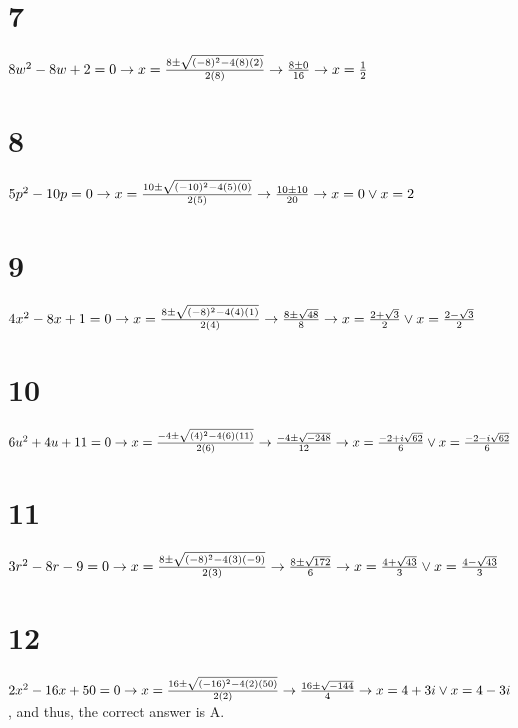 \documentclass{article}
\theoremstyle{definition}
\begin{document}
\section*{7}
$8w^2-8w+2=0\newline\rightarrow x=\frac{8\pm\sqrt{(-8)^2-4(8)(2)}}{2(8)}\newline\rightarrow \frac{8\pm 0}{16}\newline\rightarrow x=\frac{1}{2}$

\section*{8}
$5p^2-10p=0\newline\rightarrow x=\frac{10\pm\sqrt{(-10)^2-4(5)(0)}}{2(5)}\newline\rightarrow \frac{10\pm 10}{20}\newline\rightarrow x=0\vee x=2$

\section*{9}
$4x^2-8x+1=0\newline\rightarrow x=\frac{8\pm\sqrt{(-8)^2-4(4)(1)}}{2(4)}\newline\rightarrow \frac{8\pm \sqrt{48}}{8}\newline\rightarrow 
x=\frac{2+\sqrt{3}}{2}\vee x=\frac{2-\sqrt{3}}{2}$

\section*{10}
$6u^2+4u+11=0\newline\rightarrow x=\frac{-4\pm\sqrt{(4)^2-4(6)(11)}}{2(6)}\newline\rightarrow \frac{-4\pm\sqrt{-248}}{12}\newline\rightarrow 
x=\frac{-2+i\sqrt{62}}{6}\vee x=\frac{-2-i\sqrt{62}}{6}$

\section*{11}
$3r^2-8r-9=0\newline\rightarrow x=\frac{8\pm\sqrt{(-8)^2-4(3)(-9)}}{2(3)}\newline\rightarrow \frac{8\pm \sqrt{172}}{6}\newline\rightarrow 
x=\frac{4+\sqrt{43}}{3}\vee x=\frac{4-\sqrt{43}}{3}$

\section*{12}
$2x^2-16x+50=0\newline\rightarrow x=\frac{16\pm\sqrt{(-16)^2-4(2)(50)}}{2(2)}\newline\rightarrow \frac{16\pm\sqrt{-144}}{4}\newline\rightarrow 
x=4+3i\vee x=4-3i$, and thus, the correct answer is A.
\end{document}
